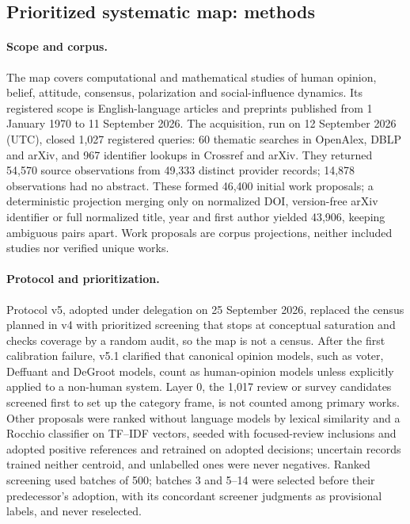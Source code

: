 \providecommand{\placeholder}[1]{\textcolor{red}{[#1]}}


\subsection*{Prioritized systematic map: methods}

\paragraph{Scope and corpus.}
The map covers computational and mathematical studies of human opinion, belief, attitude, consensus, polarization and social-influence dynamics. %
Its registered scope is English-language articles and preprints published from 1 January 1970 to 11 September 2026. %
The acquisition, run on 12 September 2026 (UTC), closed 1,027 registered queries: 60 thematic searches in OpenAlex, DBLP and arXiv, and 967 identifier lookups in Crossref and arXiv. %
They returned 54,570 source observations from 49,333 distinct provider records; 14,878 observations had no abstract. %
These formed 46,400 initial work proposals; a deterministic projection merging only on normalized DOI, version-free arXiv identifier or full normalized title, year and first author yielded 43,906, keeping ambiguous pairs apart. %
Work proposals are corpus projections, neither included studies nor verified unique works. %

\paragraph{Protocol and prioritization.}
Protocol v5, adopted under delegation on 25 September 2026, replaced the census planned in v4 with prioritized screening that stops at conceptual saturation and checks coverage by a random audit, so the map is not a census. %
After the first calibration failure, v5.1 clarified that canonical opinion models, such as voter, Deffuant and DeGroot models, count as human-opinion models unless explicitly applied to a non-human system. %
Layer 0, the 1,017 review or survey candidates screened first to set up the category frame, is not counted among primary works. %
Other proposals were ranked without language models by lexical similarity and a Rocchio classifier on TF--IDF vectors, seeded with focused-review inclusions and adopted positive references and retrained on adopted decisions; uncertain records trained neither centroid, and unlabelled ones were never negatives. %
Ranked screening used batches of 500; batches 3 and 5--14 were selected before their predecessor's adoption, with its concordant screener judgments as provisional labels, and never reselected. %

